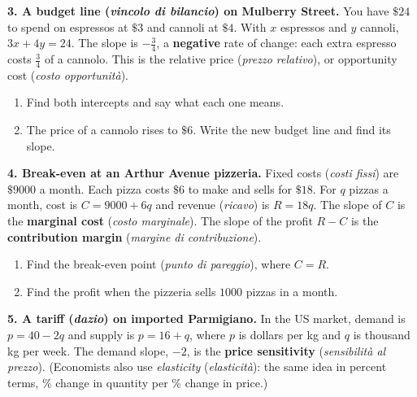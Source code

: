\documentclass[12pt, twoside]{article}
\newcommand{\ita}[1]{(\emph{#1})}
\begin{document}
\newpage

\textbf{3. A budget line \ita{vincolo di bilancio} on Mulberry Street.}
You have $\$24$ to spend on espressos at $\$3$ and cannoli at $\$4$. With
$x$ espressos and $y$ cannoli, $3x + 4y = 24$. The slope is
$-\frac{3}{4}$, a \textbf{negative} rate of change: each extra espresso
costs $\frac{3}{4}$ of a cannolo. This is the relative price
\ita{prezzo relativo}, or opportunity cost \ita{costo opportunità}.

\begin{enumerate}[label=(\alph*), itemsep=0.1cm]
  \item Find both intercepts and say what each one means.
  \vspace{1.1cm}
  \item The price of a cannolo rises to $\$6$. Write the new budget line
  and find its slope.
  \vspace{1.1cm}
\end{enumerate}

\textbf{4. Break-even at an Arthur Avenue pizzeria.} Fixed costs
\ita{costi fissi} are $\$9000$ a month. Each pizza costs $\$6$ to make and
sells for $\$18$. For $q$ pizzas a month, cost is $C = 9000 + 6q$ and
revenue \ita{ricavo} is $R = 18q$. The slope of $C$ is the
\textbf{marginal cost} \ita{costo marginale}. The slope of the profit
$R - C$ is the \textbf{contribution margin} \ita{margine di
contribuzione}.

\begin{enumerate}[label=(\alph*), itemsep=0.1cm]
  \item Find the break-even point \ita{punto di pareggio}, where $C = R$.
  \vspace{1.1cm}
  \item Find the profit when the pizzeria sells $1000$ pizzas in a month.
  \vspace{1.1cm}
\end{enumerate}

\textbf{5. A tariff \ita{dazio} on imported Parmigiano.} In the US market,
demand is $p = 40 - 2q$ and supply is $p = 16 + q$, where $p$ is dollars per
kg and $q$ is thousand kg per week. The demand slope, $-2$, is the
\textbf{price sensitivity} \ita{sensibilità al prezzo}. (Economists also
use \emph{elasticity} \ita{elasticità}: the same idea in percent terms,
\% change in quantity per \% change in price.)
\end{document}
